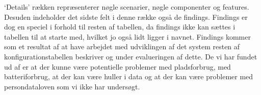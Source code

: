 `Details' rækken repræsenterer nøgle scenarier, nøgle componenter og features.
Desuden indeholder det sidste felt i denne række også de findings.
Findings er dog en speciel i forhold til resten af tabellen, da findings ikke kan sættes i tabellen til at starte med, hvilket jo også lidt ligger i navnet.
Findings kommer som et resultat af at have arbejdet med udviklingen af det system resten af konfigurationstabellen beskriver og under evalueringen af dette. 
De vi har fundet ud af er at der kunne være potentielle problemer med pladsforbrug, med batteriforbrug, at der kan være huller i data og at der kan være problemer med persondataloven som vi ikke har undersøgt.